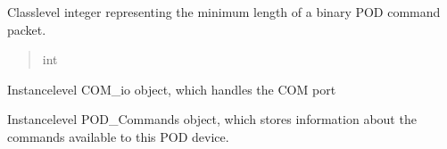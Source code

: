 \documentclass[letterpaper,10pt,english]{sphinxmanual}
\begin{document}
\begin{fulllineitems}
\begin{fulllineitems}
\begin{quote}
\begin{description}
\end{description}\end{quote}

\end{fulllineitems}


\begin{fulllineitems}
\label{\detokenize{BasicPodProtocol:BasicPodProtocol.POD_Basics.__MINBINARYLENGTH}}
\pysigstartsignatures
{}
\pysigstopsignatures
\sphinxAtStartPar
Class\sphinxhyphen{}level integer representing the minimum length of a binary POD             command packet.
\begin{quote}\begin{description}
\sphinxAtStartPar
int

\end{description}\end{quote}

\end{fulllineitems}


\begin{fulllineitems}
\label{\detokenize{BasicPodProtocol:BasicPodProtocol.POD_Basics._port}}
\pysigstartsignatures
{}
\pysigstopsignatures
\sphinxAtStartPar
Instance\sphinxhyphen{}level COM\_io object, which handles the COM port
\begin{quote}\begin{description}
\sphinxAtStartPar
{\hyperref[\detokenize{SerialCommunication:SerialCommunication.COM_io}]{}}

\end{description}\end{quote}

\end{fulllineitems}


\begin{fulllineitems}
\label{\detokenize{BasicPodProtocol:BasicPodProtocol.POD_Basics._commands}}
\pysigstartsignatures
{}
\pysigstopsignatures
\sphinxAtStartPar
Instance\sphinxhyphen{}level POD\_Commands object, which stores information about             the commands available to this POD device.
\begin{quote}\begin{description}
\sphinxAtStartPar
{\hyperref[\detokenize{PodCommands:PodCommands.POD_Commands}]{}}


\end{description}
\end{quote}
\end{fulllineitems}
\end{fulllineitems}
\end{document}
